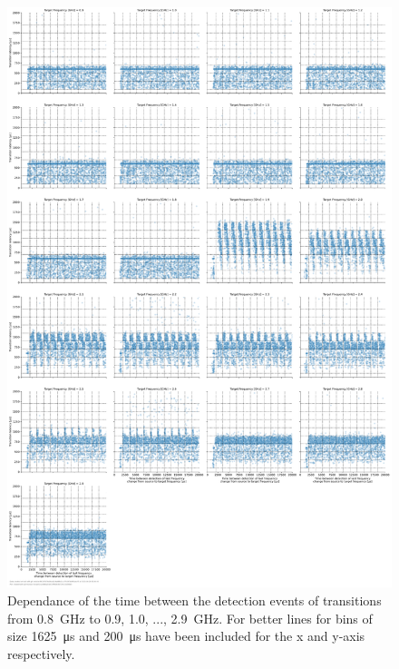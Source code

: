 \begin{figure}[]
    \centering
    \includegraphics[width=\columnwidth]{fig/ftalat/ftalat_scatter_wait_transition_latency_hati_source_0.8.pdf}
    \caption{Dependance of the time between the detection events of transitions from \SI{0.8}{\GHz} to \SI{0.9}{}, \SI{1.0}{}, ..., \SI{2.9}{\GHz}. For better lines for bins of size \SI{1625}{\us} and \SI{200}{\us} have been included for the x and y-axis respectively.}
\end{figure}
